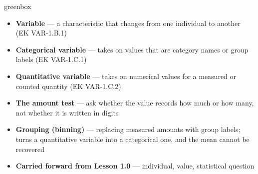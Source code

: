 \documentclass[10pt]{article}
\begin{document}
\boxguard
\begin{skillbox}{greenbox}
\begin{minipage}[t]{0.48\linewidth}
    \begin{itemize}
        \item \textbf{Variable} --- a characteristic that changes from one individual to
              another (EK VAR-1.B.1)
        \item \textbf{Categorical variable} --- takes on values that are category names or
              group labels (EK VAR-1.C.1)
        \item \textbf{Quantitative variable} --- takes on numerical values for a measured or
              counted quantity (EK VAR-1.C.2)
    \end{itemize}
\end{minipage}
\hfill
\begin{minipage}[t]{0.48\linewidth}
    \begin{itemize}
        \item \textbf{The amount test} --- ask whether the value records how much or how many,
              not whether it is written in digits
        \item \textbf{Grouping (binning)} --- replacing measured amounts with group labels;
              turns a quantitative variable into a categorical one, and the mean cannot be
              recovered
        \item \textbf{Carried forward from Lesson 1.0} --- individual, value, statistical
              question
    \end{itemize}
\end{minipage}
\end{skillbox}
\end{document}
